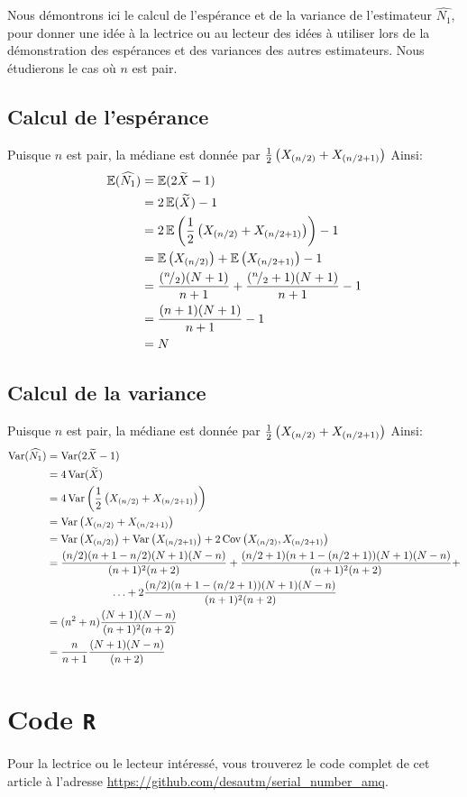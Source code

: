\documentclass[10pt]{article}
\newcommand*\rfrac[2]{{}^{#1}\!/_{#2}}
\begin{document}
Nous démontrons ici le calcul de l'espérance et de la variance de
l'estimateur \(\widehat{N_1}\), pour donner une idée à la lectrice ou au
lecteur des idées à utiliser lors de la démonstration des espérances et
des variances des autres estimateurs. Nous étudierons le cas où \(n\)
est pair.

\hypertarget{calcul-de-lesperance}{%
\subsection{Calcul de l'espérance}\label{calcul-de-lesperance}}

Puisque \(n\) est pair, la médiane est donnée par
\(\frac{1}{2}\left(X_{\left(n/2\right)}+X_{\left(n/2+1\right)}\right)\) Ainsi: \begin{align*}
\esp(\widehat{N_1}) &= \esp(2\widetilde{X}-1) \\
&= 2\esp(\widetilde{X})-1 \\
&= 2\esp\lr{\frac{1}{2}\lr{X_{\lr{n/2}}+X_{\lr{n/2+1}}}}-1 \\
&= \esp\lr{X_{\lr{n/2}}}+\esp\lr{X_{\lr{n/2+1}}}-1 \\
&= \frac{(\rfrac{n}{2})(N+1)}{n+1}+ \frac{(\rfrac{n}{2}+1)(N+1)}{n+1}-1 \\
&= \frac{(n+1)(N+1)}{n+1}-1 \\
&= N
\end{align*}

\hypertarget{calcul-de-la-variance}{%
\subsection{Calcul de la variance}\label{calcul-de-la-variance}}

Puisque \(n\) est pair, la médiane est donnée par
\(\frac{1}{2}\left(X_{\left(n/2\right)}+X_{\left(n/2+1\right)}\right)\) Ainsi: \begin{align*}
\operatorname{Var}(\widehat{N_1}) &= \operatorname{Var}(2\widetilde{X}-1) \\
&= 4\operatorname{Var}(\widetilde{X}) \\
&= 4\operatorname{Var}\left(\frac{1}{2}\left(X_{\left(n/2\right)}+X_{\left(n/2+1\right)}\right)\right) \\
&= \operatorname{Var}\left(X_{\left(n/2\right)}+X_{\left(n/2+1\right)}\right) \\
&= \operatorname{Var}\left(X_{\left(n/2\right)}\right)+\operatorname{Var}\left(X_{\left(n/2+1\right)}\right)+2\operatorname{Cov}\left(X_{\left(n/2\right)},X_{\left(n/2+1\right)}\right) \\
&= \frac{(n/2)(n+1-n/2)(N+1)(N-n)}{(n+1)^2(n+2)}+\frac{(n/2+1)(n+1-(n/2+1))(N+1)(N-n)}{(n+1)^2(n+2)}+ \\
&\qquad\qquad\qquad \ldots+2\frac{(n/2)(n+1-(n/2+1))(N+1)(N-n)}{(n+1)^2(n+2)} \\
&= (n^2+n)\frac{(N+1)(N-n)}{(n+1)^2(n+2)} \\
&= \frac{n}{n+1}\frac{(N+1)(N-n)}{(n+2)}
\end{align*}

\hypertarget{code-r}{%
\section{\texorpdfstring{Code \texttt{R}
\label{code}}{Code R }}\label{code-r}}

Pour la lectrice ou le lecteur intéressé, vous trouverez le code complet
de cet article à l'adresse
\url{https://github.com/desautm/serial_number_amq}.


\end{document}
